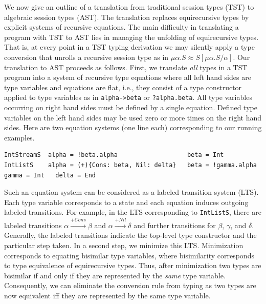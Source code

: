 We now give an outline of a translation from traditional session types
(TST) to algebraic session types (AST).
The translation replaces equirecursive types by explicit
systems of recursive equations.
The main difficulty in translating a program with  TST to AST lies in managing the unfolding of
equirecursive types. That is, at every point in a TST typing
derivation we may silently apply a type conversion that unrolls a
recursive session type as in $\mu\alpha.S \approx S[\mu\alpha.S /
\alpha]$. Our translation to AST proceeds as follows.
First, we translate \emph{all} types in a TST program into a system of recursive
type equations where all left hand sides are type variables and
equations are flat, i.e., they consist of a type constructor applied
to type variables as in
\lstinline{alpha->beta} or \lstinline{?alpha.beta}. All type variables
occurring on right hand sides must be defined by a single
equation. Defined type variables on the left hand sides may be used
zero or more times on the right hand sides. Here are two equation
systems (one line each)
corresponding to our running examples.
\begin{lstlisting}
IntStreamS  alpha = !beta.alpha                   beta = Int
IntListS    alpha = (+){Cons: beta, Nil: delta}   beta = !gamma.alpha    gamma = Int   delta = End
\end{lstlisting}
Such an equation system can be considered as a
labeled transition system (LTS). Each type variable corresponds to a
state and each equation induces outgoing labeled transitions. For
example, in the LTS corresponding to \lstinline{IntListS}, there are
labeled transitions $\alpha \stackrel{+Cons}{\longrightarrow} \beta$ and $\alpha \stackrel{+Nil}
{\longrightarrow} \delta$ and further transitions for $\beta$,
$\gamma$, and $\delta$. Generally, the labeled transitions indicate
the top-level type constructor and the particular step taken. In a second step, we minimize this
LTS. Minimization corresponds to equating bisimilar type
variables, where bisimilarity corresponds to type equivalence of
equirecursive types. Thus, after minimization two types are bisimilar
if and only if they are represented by the \emph{same} type
variable. Consequently, we can eliminate the conversion rule from
typing as two types are now equivalent iff they are represented by the
same type variable.

